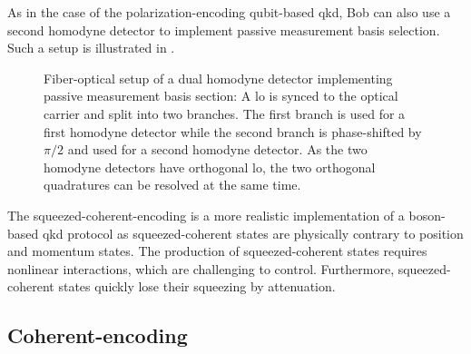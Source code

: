 As in the case of the polarization-encoding qubit-based \gls{qkd}, Bob can also use a second homodyne detector to implement passive measurement basis selection.
Such a setup is illustrated in .
\begin{figure}[htb]
	\centering
	
	\caption{Fiber-optical setup of a dual homodyne detector implementing passive measurement basis section: A \gls{lo} is synced to the optical carrier and split into two branches. The first branch is used for a first homodyne detector while the second branch is phase-shifted by $\pi/2$ and used for a second homodyne detector. As the two homodyne detectors have orthogonal \gls{lo}, the two orthogonal quadratures can be resolved at the same time.}\label{fig:coherent_receiver_passive}
\end{figure}
The squeezed-coherent-encoding is a more realistic implementation of a boson-based \gls{qkd} protocol as squeezed-coherent states are physically contrary to position and momentum states.
The production of squeezed-coherent states requires nonlinear interactions, which are challenging to control.
Furthermore, squeezed-coherent states quickly lose their squeezing by attenuation.

\FloatBarrier
\subsection{Coherent-encoding}

